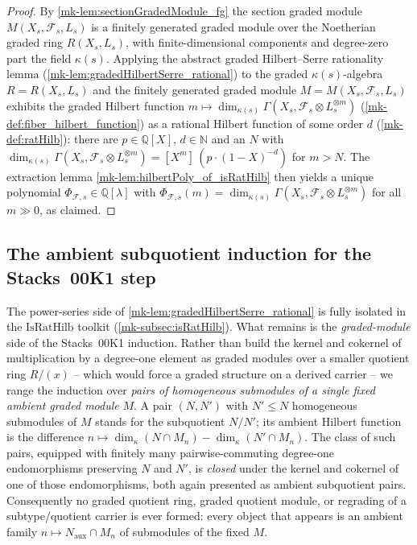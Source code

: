 \begin{proof}
  By \ref{mk-lem:sectionGradedModule_fg} the section graded module
  \(M(X_s, \mathcal{F}_s, L_s)\) is a finitely generated graded module over the
  Noetherian graded ring \(R(X_s, L_s)\), with finite-dimensional components and
  degree-zero part the field \(\kappa(s)\). Applying the abstract graded
  Hilbert--Serre rationality lemma (\ref{mk-lem:gradedHilbertSerre_rational}) to the
  graded \(\kappa(s)\)-algebra \(R = R(X_s, L_s)\) and the finitely generated
  graded module \(M = M(X_s, \mathcal{F}_s, L_s)\) exhibits the graded Hilbert
  function
  \(m \mapsto \dim_{\kappa(s)} \Gamma(X_s, \mathcal{F}_s \otimes L_s^{\otimes m})\)
  (\ref{mk-def:fiber_hilbert_function}) as a rational Hilbert function of some
  order \(d\) (\ref{mk-def:ratHilb}): there are \(p \in \mathbb{Q}[X]\),
  \(d \in \mathbb{N}\) and an \(N\) with
  \(\dim_{\kappa(s)} \Gamma(X_s, \mathcal{F}_s \otimes L_s^{\otimes m})
  = [X^m]\,(p \cdot (1 - X)^{-d})\) for \(m > N\). The extraction lemma
  \ref{mk-lem:hilbertPoly_of_isRatHilb} then yields a unique polynomial
  \(\Phi_{\mathcal{F},s} \in \mathbb{Q}[\lambda]\) with
  \(\Phi_{\mathcal{F},s}(m) = \dim_{\kappa(s)}
  \Gamma(X_s, \mathcal{F}_s \otimes L_s^{\otimes m})\) for all \(m \gg 0\),
  as claimed.
\end{proof}

\subsection{The ambient subquotient induction for the Stacks~00K1 step}
\label{mk-subsec:gradedModuleApi}

The power-series side of \ref{mk-lem:gradedHilbertSerre_rational} is fully isolated
in the \(\mathrm{IsRatHilb}\) toolkit (\ref{mk-subsec:isRatHilb}). What remains is
the \emph{graded-module} side of the Stacks~00K1 induction. Rather than build the
kernel and cokernel of multiplication by a degree-one element as graded modules
over a smaller quotient ring \(R/(x)\) -- which would force a graded structure on a
derived carrier -- we range the induction over \emph{pairs of homogeneous
submodules of a single fixed ambient graded module} \(M\). A pair \((N, N')\) with
\(N' \le N\) homogeneous submodules of \(M\) stands for the subquotient \(N/N'\); its
ambient Hilbert function is the difference \(n \mapsto \dim_\kappa(N \cap M_n) -
\dim_\kappa(N' \cap M_n)\). The class of such pairs, equipped with finitely many
pairwise-commuting degree-one endomorphisms preserving \(N\) and \(N'\), is
\emph{closed} under the kernel and cokernel of one of those endomorphisms, both
again presented as ambient subquotient pairs. Consequently no graded quotient ring,
graded quotient module, or regrading of a subtype/quotient carrier is ever formed:
every object that appears is an ambient family \(n \mapsto N_{\mathrm{aux}} \cap M_n\)
of submodules of the fixed \(M\).

